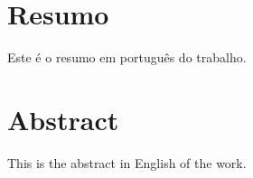 \chapter*{Resumo}
    Este \'{e} o resumo em portugu\^{e}s do trabalho.


\chapter*{Abstract}
    This is the abstract in English of the work.